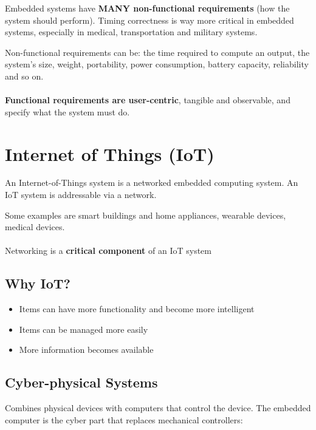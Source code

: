 Embedded systems have \textbf{MANY non-functional requirements} (how the system should perform). Timing
correctness is way more critical in embedded systems, especially in medical, transportation and
military systems.

Non-functional requirements can be: the time required to compute an output, the system's size, weight,
portability, power consumption, battery capacity, reliability and so on.


\paragraph{}
\textbf{Functional requirements are user-centric}, tangible and observable, and specify what the system must do.

\newpage
\section{Internet of Things (IoT)}
An Internet-of-Things system is a networked embedded
computing system. An IoT system is addressable
via a network.

Some examples are smart buildings and home appliances, wearable devices, medical devices.

\paragraph{}
Networking is a \textbf{critical component} of an IoT system

\subsection{Why IoT?}
\begin{itemize}
    \item[] Items can have more functionality and become more intelligent
    \item[] Items can be managed more easily
    \item[] More information becomes available
\end{itemize}


\subsection{Cyber-physical Systems}

Combines physical devices with computers that control the device. The embedded computer is the cyber part that replaces mechanical controllers:

